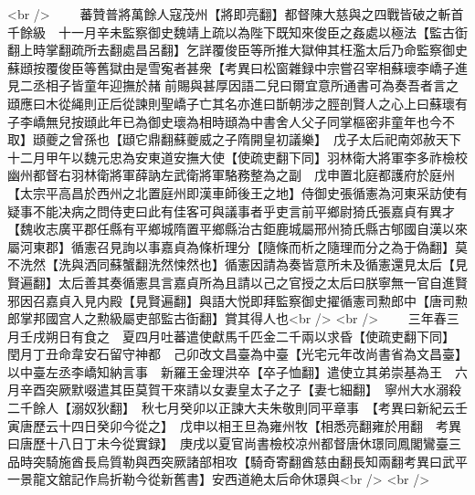 <br />
　　蕃贊普將萬餘人寇茂州【將即亮翻】都督陳大慈與之四戰皆破之斬首千餘級　十一月辛未監察御史魏靖上疏以為陛下既知來俊臣之姦處以極法【監古衘翻上時掌翻疏所去翻處昌呂翻】乞詳覆俊臣等所推大獄伸其枉濫太后乃命監察御史蘇頲按覆俊臣等舊獄由是雪寃者甚衆【考異曰松窗雜録中宗嘗召宰相蘇瓌李嶠子進見二丞相子皆童年迎撫於赭前賜與甚厚因語二兒曰爾宜意所通書可為奏吾者言之頲應曰木從䋲則正后從諫則聖嶠子亡其名亦進曰斮朝涉之脛剖賢人之心上曰蘇瓌有子李嶠無兒按頲此年已為御史瓌為相時頲為中書舍人父子同掌樞密非童年也今不取】頲夔之曾孫也【頲它鼎翻蘇夔威之子隋開皇初議樂】　戊子太后祀南郊赦天下　十二月甲午以魏元忠為安東道安撫大使【使疏吏翻下同】羽林衛大將軍李多祚檢校幽州都督右羽林衛將軍薛訥左武衛將軍駱務整為之副　戊申置北庭都護府於庭州【太宗平高昌於西州之北置庭州即漢車師後王之地】侍御史張循憲為河東采訪使有疑事不能决病之問侍吏曰此有佳客可與議事者乎吏言前平鄉尉猗氏張嘉貞有異才【魏收志廣平郡任縣有平鄉城隋置平鄉縣治古鉅鹿城屬邢州猗氏縣古郇國自漢以來屬河東郡】循憲召見詢以事嘉貞為條析理分【隨條而析之隨理而分之為于偽翻】莫不洗然【洗與洒同蘇蟹翻洗然悚然也】循憲因請為奏皆意所未及循憲還見太后【見賢遍翻】太后善其奏循憲具言嘉貞所為且請以己之官授之太后曰朕寧無一官自進賢邪因召嘉貞入見内殿【見賢遍翻】與語大悦即拜監察御史擢循憲司勲郎中【唐司勲郎掌邦國宫人之勲級屬吏部監古衘翻】賞其得人也<br />
<br />
　　三年春三月壬戌朔日有食之　夏四月吐蕃遣使獻馬千匹金二千兩以求昏【使疏吏翻下同】　閏月丁丑命韋安石留守神都　己卯改文昌臺為中臺【光宅元年改尚書省為文昌臺】以中臺左丞李嶠知納言事　新羅王金理洪卒【卒子恤翻】遣使立其弟崇基為王　六月辛酉突厥默啜遣其臣莫賀干來請以女妻皇太子之子【妻七細翻】　寧州大水溺殺二千餘人【溺奴狄翻】　秋七月癸卯以正諫大夫朱敬則同平章事　【考異曰新紀云壬寅唐歷云十四日癸卯今從之】　戊申以相王旦為雍州牧【相悉亮翻雍於用翻　考異曰唐歷十八日丁未今從實録】　庚戌以夏官尚書檢校凉州都督唐休璟同鳳閣鸞臺三品時突騎施酋長烏質勒與西突厥諸部相攻【騎奇寄翻酋慈由翻長知兩翻考異曰武平一景龍文舘記作烏折勒今從新舊書】安西道絶太后命休璟與<br />
<br />
